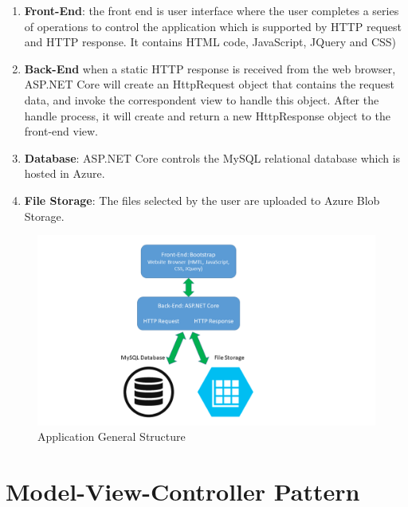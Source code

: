 \begin{enumerate}
\item \textbf{Front-End}: the front end is user interface where the user completes a series of operations to control the application which is supported by HTTP request and HTTP response. It contains HTML code, JavaScript, JQuery and CSS)

\item \textbf{Back-End} when a static HTTP response is received from the web browser, ASP.NET Core will create an HttpRequest object that contains the request data, and invoke the correspondent view to handle this object. After the handle process, it will create and return a new HttpResponse object to the front-end view.
\item \textbf{Database}: ASP.NET Core controls the MySQL relational database which is hosted in Azure.
\item \textbf{File Storage}: The files selected by the user are uploaded to Azure Blob Storage.


\end{enumerate}

\begin{figure}[h]
\begin{center}
\includegraphics[width=17cm]{imgs/Application_Structure.png}
\end{center}\vspace{-0.3cm}
\caption[Application General Structure]{Application General Structure} \label{app_Structure}
\end{figure}


\section{Model-View-Controller Pattern}
\label{sub:MVC}

